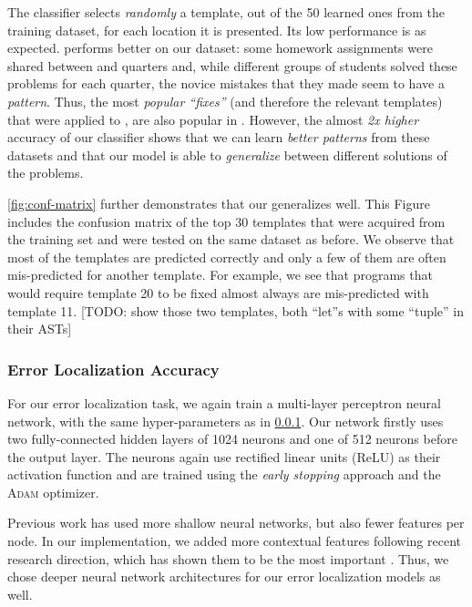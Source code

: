 The \random classifier selects \emph{randomly} a template, out of the 50 learned
ones from the \SPRING training dataset, for each location it is presented. Its
low performance is as expected.
\popular performs better on our dataset:
some homework assignments were
shared between \SPRING and \FALL quarters and, while different groups of
students solved these problems for each quarter, the novice mistakes that they
made seem to have a \emph{pattern}. Thus, the most \emph{popular ``fixes''} (and
therefore the relevant templates) that were applied to \SPRING, are also popular
in \FALL. However, the almost \emph{2x higher} accuracy of our \dnn classifier
shows that we can learn \emph{better patterns} from these datasets and that our
\dnn model is able to \emph{generalize} between different solutions of the
problems.

\autoref{fig:conf-matrix} further demonstrates that our \dnn generalizes well. This
Figure includes the confusion matrix of the top 30 templates that were acquired
from the training set and were tested on the same \FALL dataset as before. We
observe that most of the templates are predicted correctly and only a few of
them are often mis-predicted for another template. For example, we see that
programs that would require template 20 to be fixed almost always are
mis-predicted with template 11. [TODO: show those two templates, both ``let''s
with some ``tuple'' in their ASTs]

\subsubsection{Error Localization Accuracy}
\label{subsubsec:error_loc_acc}

For our error localization task, we again train a multi-layer perceptron neural
network, with the same hyper-parameters as in \ref{subsubsec:error_loc_acc}. Our
network firstly uses two fully-connected hidden layers of 1024 neurons and one
of 512 neurons before the output layer. The neurons again use rectified linear
units (ReLU) as their activation function and are trained using the \emph{early
stopping} approach and the \textsc{Adam} optimizer.

Previous work \citep[][]{Seidel:2017} has used more shallow neural networks, but
also fewer features per node. In our implementation, we added more contextual
features following recent research direction, which has shown them to be the
most important \citep[TODO: add the lstm paper][]{Seidel:2017}. Thus, we
chose deeper neural network architectures for our error localization models as
well.

